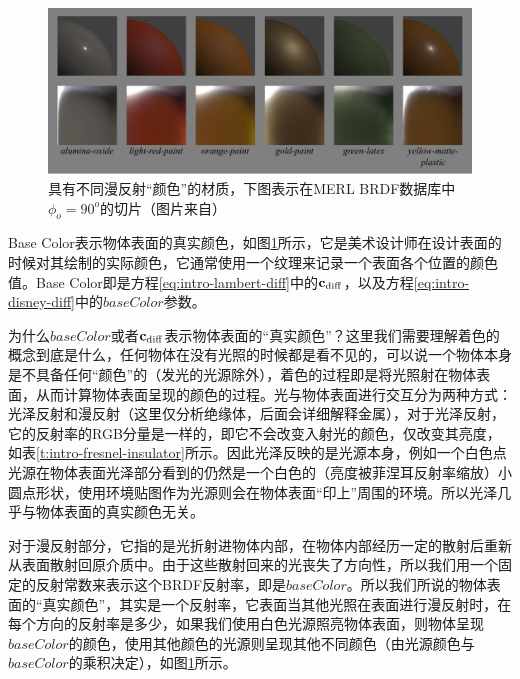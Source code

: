 \begin{figure}
	\includegraphics[width=1.0\textwidth]{figures/intro/diffusebands}
	\caption{具有不同漫反射“颜色”的材质，下图表示在MERL BRDF数据库中$\phi_o=90^o$的切片（图片来自\cite{a:PhysicallyBasedShadingatDisney}）}
	\label{f:intro-basecolor}
\end{figure}

Base Color表示物体表面的真实颜色，如图\ref{f:intro-basecolor}所示，它是美术设计师在设计表面的时候对其绘制的实际颜色，它通常使用一个纹理来记录一个表面各个位置的颜色值。Base Color即是方程\ref{eq:intro-lambert-diff}中的$\mathbf{c}_{\rm diff}$，以及方程\ref{eq:intro-disney-diff}中的$baseColor$参数。

\begin{shaded*}
为什么$baseColor$或者$\mathbf{c}_{\rm diff}$表示物体表面的“真实颜色”？这里我们需要理解着色的概念到底是什么，任何物体在没有光照的时候都是看不见的，可以说一个物体本身是不具备任何“颜色”的（发光的光源除外），着色的过程即是将光照射在物体表面，从而计算物体表面呈现的颜色的过程。光与物体表面进行交互分为两种方式：光泽反射和漫反射（这里仅分析绝缘体，后面会详细解释金属），对于光泽反射，它的反射率的RGB分量是一样的，即它不会改变入射光的颜色，仅改变其亮度，如表\ref{t:intro-fresnel-insulator}所示。因此光泽反映的是光源本身，例如一个白色点光源在物体表面光泽部分看到的仍然是一个白色的（亮度被菲涅耳反射率缩放）小圆点形状，使用环境贴图作为光源则会在物体表面“印上”周围的环境。所以光泽几乎与物体表面的真实颜色无关。

对于漫反射部分，它指的是光折射进物体内部，在物体内部经历一定的散射后重新从表面散射回原介质中。由于这些散射回来的光丧失了方向性，所以我们用一个固定的反射常数来表示这个BRDF反射率，即是$baseColor$。所以我们所说的物体表面的“真实颜色”，其实是一个反射率，它表面当其他光照在表面进行漫反射时，在每个方向的反射率是多少，如果我们使用白色光源照亮物体表面，则物体呈现$baseColor$的颜色，使用其他颜色的光源则呈现其他不同颜色（由光源颜色与$baseColor$的乘积决定），如图\ref{f:intro-basecolor}所示。
\end{shaded*}



